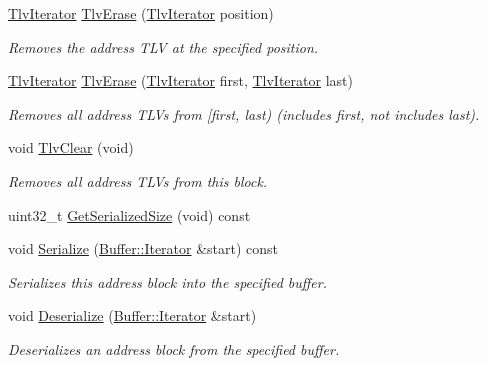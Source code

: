 \begin{DoxyCompactItemize}
\hyperlink{classns3_1_1PbbAddressBlock_a3bd1d32d5fa278168a97ded673ba0fd3}{Tlv\+Iterator} \hyperlink{classns3_1_1PbbAddressBlock_ac69faf6428772f425ebacc61965a5c74}{Tlv\+Erase} (\hyperlink{classns3_1_1PbbAddressBlock_a3bd1d32d5fa278168a97ded673ba0fd3}{Tlv\+Iterator} position)
\begin{DoxyCompactList}\small\item\em Removes the address T\+LV at the specified position. \end{DoxyCompactList}\item 
\hyperlink{classns3_1_1PbbAddressBlock_a3bd1d32d5fa278168a97ded673ba0fd3}{Tlv\+Iterator} \hyperlink{classns3_1_1PbbAddressBlock_a7797b66ea9ee15e0b751360f4c2d5a56}{Tlv\+Erase} (\hyperlink{classns3_1_1PbbAddressBlock_a3bd1d32d5fa278168a97ded673ba0fd3}{Tlv\+Iterator} first, \hyperlink{classns3_1_1PbbAddressBlock_a3bd1d32d5fa278168a97ded673ba0fd3}{Tlv\+Iterator} last)
\begin{DoxyCompactList}\small\item\em Removes all address T\+L\+Vs from \mbox{[}first, last) (includes first, not includes last). \end{DoxyCompactList}\item 
void \hyperlink{classns3_1_1PbbAddressBlock_ae7d312a150cdc25f4a85e4e49598b925}{Tlv\+Clear} (void)
\begin{DoxyCompactList}\small\item\em Removes all address T\+L\+Vs from this block. \end{DoxyCompactList}\item 
uint32\+\_\+t \hyperlink{classns3_1_1PbbAddressBlock_a937a3e196da903b7b6ddee22b16e8fa4}{Get\+Serialized\+Size} (void) const 
\item 
void \hyperlink{classns3_1_1PbbAddressBlock_a8362337c52d7d46b901308572ed870a0}{Serialize} (\hyperlink{classns3_1_1Buffer_1_1Iterator}{Buffer\+::\+Iterator} \&start) const 
\begin{DoxyCompactList}\small\item\em Serializes this address block into the specified buffer. \end{DoxyCompactList}\item 
void \hyperlink{classns3_1_1PbbAddressBlock_ac3afa495e1765e58ea203d42a8860492}{Deserialize} (\hyperlink{classns3_1_1Buffer_1_1Iterator}{Buffer\+::\+Iterator} \&start)
\begin{DoxyCompactList}\small\item\em Deserializes an address block from the specified buffer. \end{DoxyCompactList}\item 

\end{DoxyCompactItemize}
